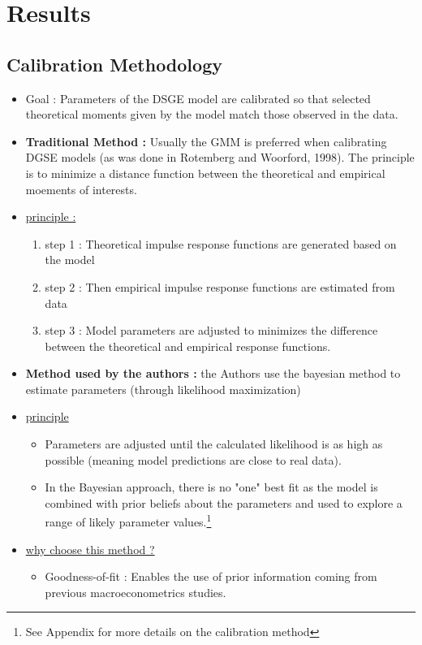 \documentclass{article}
\begin{document}
\section{Results}
\subsection{Calibration Methodology}
\begin{itemize}
    \item Goal : Parameters of the DSGE model are calibrated so that selected theoretical moments given by the model match those observed in the data.
    \item \textbf{Traditional Method :} Usually the GMM is preferred when calibrating DGSE models (as was done in Rotemberg and Woorford, 1998). The principle is to minimize a distance function between the theoretical and empirical moements of interests.
    \item \underline{principle : }
    \begin{enumerate}
        \item step 1 : Theoretical impulse response functions are generated based on the model
        \item step 2 : Then empirical impulse response functions are estimated from data 
        \item step 3 : Model parameters are adjusted to minimizes the difference between the theoretical and empirical response functions. 
    \end{enumerate}
    \item \textbf{Method used by the authors :} the Authors use the bayesian method to estimate parameters (through likelihood maximization)
    \item \underline{principle}
    \begin{itemize}
        \item Parameters are adjusted until the calculated likelihood is as high as possible (meaning model predictions are close to real data). 
        \item In the Bayesian approach, there is no "one" best fit as the model is combined with prior beliefs about the parameters and used to explore a range of likely parameter values.\footnote{See Appendix for more details on the calibration method}
    \end{itemize}
    \item \underline{why choose this method ?}
    \begin{itemize}
        \item Goodness-of-fit : Enables the use of prior information coming from previous macroeconometrics studies.

\end{itemize}
\end{itemize}
\end{document}
